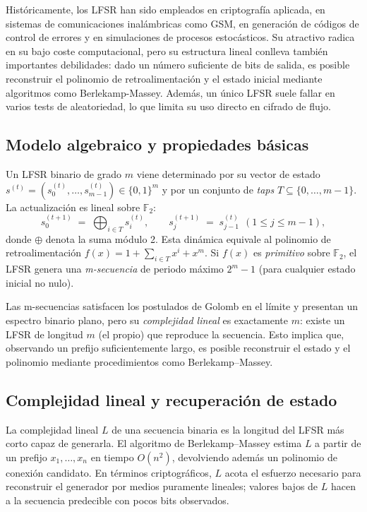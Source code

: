 Históricamente, los LFSR han sido empleados en criptografía aplicada, en
sistemas de comunicaciones inalámbricas como GSM, en generación de códigos de
control de errores y en simulaciones de procesos estocásticos. Su atractivo
radica en su bajo coste computacional, pero su estructura lineal conlleva
también importantes debilidades: dado un número suficiente de bits de salida, es
posible reconstruir el polinomio de retroalimentación y el estado inicial
mediante algoritmos como Berlekamp-Massey. Además, un único LFSR suele fallar
en varios tests de aleatoriedad, lo que limita su uso directo en cifrado de
flujo.

\subsection*{Modelo algebraico y propiedades básicas}

Un LFSR binario de grado $m$ viene determinado por su vector de estado
$s^{(t)}=(s_0^{(t)},\dots,s_{m-1}^{(t)})\in\{0,1\}^m$ y por un conjunto de
\emph{taps} $T\subseteq \{0,\dots,m-1\}$. La actualización es lineal sobre
$\mathbb{F}_2$:
\[
s_0^{(t+1)} \;=\; \bigoplus_{i\in T} s_i^{(t)},\qquad
s_j^{(t+1)} \;=\; s_{j-1}^{(t)}\ \ (1\le j\le m-1),
\]
donde $\oplus$ denota la suma módulo 2. Esta dinámica equivale al polinomio de
retroalimentación $f(x)=1+\sum_{i\in T} x^{i} + x^m$. Si $f(x)$ es \emph{primitivo}
sobre $\mathbb{F}_2$, el LFSR genera una \emph{m-secuencia} de periodo máximo
$2^m{-}1$ (para cualquier estado inicial no nulo).

Las m-secuencias satisfacen los postulados de Golomb en el límite y presentan
un espectro binario plano, pero su \emph{complejidad lineal} es exactamente $m$:
existe un LFSR de longitud $m$ (el propio) que reproduce la secuencia. Esto
implica que, observando un prefijo suficientemente largo, es posible reconstruir
el estado y el polinomio mediante procedimientos como Berlekamp--Massey.

\subsection*{Complejidad lineal y recuperación de estado}

La complejidad lineal $L$ de una secuencia binaria es la longitud del LFSR más
corto capaz de generarla. El algoritmo de Berlekamp--Massey estima $L$ a partir
de un prefijo $x_1,\dots,x_n$ en tiempo $O(n^2)$, devolviendo además un
polinomio de conexión candidato. En términos criptográficos, $L$ acota el
esfuerzo necesario para reconstruir el generador por medios puramente lineales;
valores bajos de $L$ hacen a la secuencia predecible con pocos bits observados.

